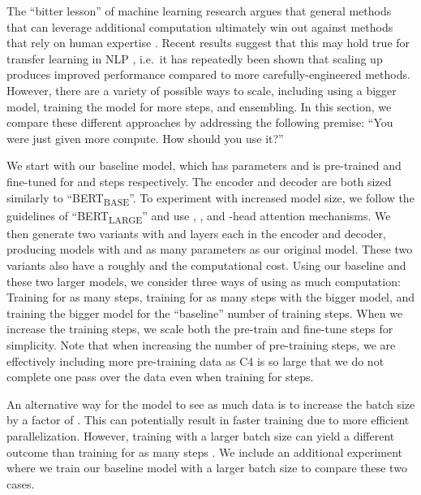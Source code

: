 \documentclass[twoside,11pt]{article}
\begin{document}
The ``bitter lesson'' of machine learning research argues that general methods that can leverage additional computation ultimately win out against methods that rely on human expertise \citep{sutton2019bitter,hestness2017deep,shazeer2017outrageously,jozefowicz2016exploring,mahajan2018exploring,shazeer2018mesh,shazeer2017outrageously,huang2018gpipe,keskar2019ctrl}.
Recent results suggest that this may hold true for transfer learning in NLP \citep{liu2019roberta,radford2019language,yang2019xlnet,lan2019albert}, i.e.\ it has repeatedly been shown that scaling up produces improved performance compared to more carefully-engineered methods.
However, there are a variety of possible ways to scale, including using a bigger model, training the model for more steps, and ensembling.
In this section, we compare these different approaches by addressing the following premise: ``You were just given  more compute. How should you use it?''

We start with our baseline model, which has  parameters and is pre-trained and fine-tuned for  and  steps respectively.
The encoder and decoder are both sized similarly to ``BERT\textsubscript{BASE}''.
To experiment with increased model size, we follow the guidelines of ``BERT\textsubscript{LARGE}'' \cite{devlin2018bert} and use , ,  and -head attention mechanisms.
We then generate two variants with  and  layers each in the encoder and decoder, producing models with  and  as many parameters as our original model.
These two variants also have a roughly  and  the computational cost.
Using our baseline and these two larger models, we consider three ways of using  as much computation: Training for  as many steps, training for  as many steps with the  bigger model, and training the  bigger model for the ``baseline'' number of training steps.
When we increase the training steps, we scale both the pre-train and fine-tune steps for simplicity.
Note that when increasing the number of pre-training steps, we are effectively including more pre-training data as C4 is so large that we do not complete one pass over the data even when training for  steps.

An alternative way for the model to see  as much data is to increase the batch size by a factor of .
This can potentially result in faster training due to more efficient parallelization.
However, training with a  larger batch size can yield a different outcome than training for  as many steps \citep{shallue2018measuring}.
We include an additional experiment where we train our baseline model with a  larger batch size to compare these two cases.
\end{document}

